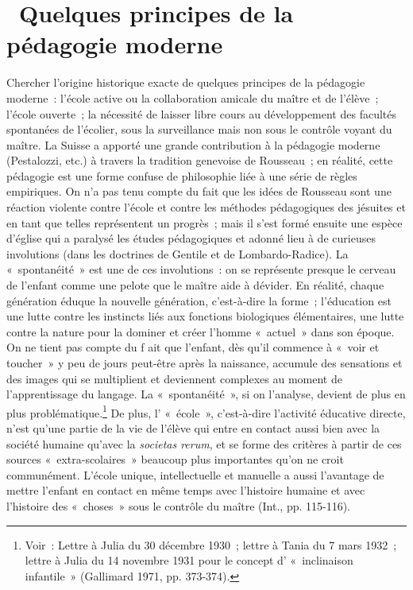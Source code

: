 \documentclass[french,twoside]{book} %
\begin{document}
\section[{ Quelques principes de la pédagogie moderne}]{ Quelques principes de la pédagogie moderne}
\noindent Chercher l’origine historique exacte de quelques principes de la pédagogie moderne : l’école active ou la collaboration amicale du maître et de l’élève ; l’école ouverte ; la nécessité de laisser libre cours au développement des facultés spontanées de l’écolier, sous la surveillance mais non sous le contrôle voyant du maître. La Suisse a apporté une grande contribution à la pédagogie moderne (Pestalozzi, etc.) à travers la tradition genevoise de Rousseau ; en réalité, cette pédagogie est une forme confuse de philosophie liée à une série de règles empiriques. On n’a pas tenu compte du fait que les idées de Rousseau sont une réaction violente contre l’école et contre les méthodes pédagogiques des jésuites et en tant que telles représentent un progrès ; mais il s’est formé ensuite une espèce d’église qui a paralysé les études pédagogiques et adonné lieu à de curieuses involutions (dans les doctrines de Gentile et de Lombardo-Radice). La « spontanéité » est une de ces involutions : on se représente presque le cerveau de l’enfant comme une pelote que le maître aide à dévider. En réalité, chaque génération éduque la nouvelle génération, c’est-à-dire la forme ; l’éducation est une lutte contre les instincts liés aux fonctions biologiques élémentaires, une lutte contre la nature pour la dominer et créer l’homme « actuel » dans son époque. On ne tient pas compte du f ait que l’enfant, dès qu’il commence à « voir et toucher » y peu de jours peut-être après la naissance, accumule des sensations et des images qui se multiplient et deviennent complexes au moment de l’apprentissage du langage. La « spontanéité », si on l’analyse, devient de plus en plus problématique.\footnote{Voir : Lettre à Julia du 30 décembre 1930 ; lettre à Tania du 7 mars 1932 ; lettre à Julia du 14 novembre 1931 pour le concept d’ « inclinaison infantile » (Gallimard 1971, pp. 373-374).} De plus, l’ « école », c’est-à-dire l’activité éducative directe, n’est qu’une partie de la vie de l’élève qui entre en contact aussi bien avec la société humaine qu’avec la \emph{societas rerum}, et se forme des critères à partir de ces sources « extra-scolaires » beaucoup plus importantes qu’on ne croit communément. L'école unique, intellectuelle et manuelle a aussi l’avantage de mettre l’enfant en contact en même temps avec l’histoire humaine et avec l’histoire des « choses » sous le contrôle du maître (Int., pp. 115-116).\par
{\raggedleft \noindent [1929-1930]}
\end{document}
